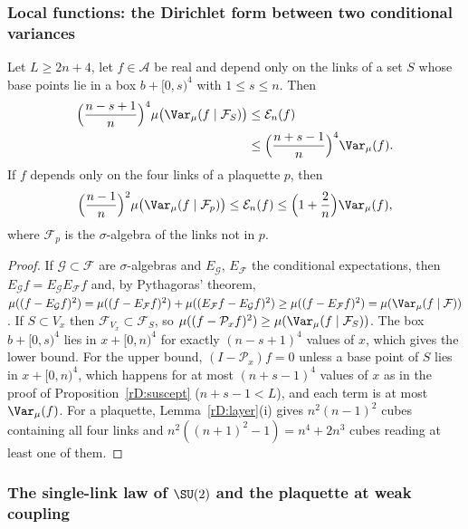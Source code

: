 \subsubsection{Local functions: the Dirichlet form between two conditional
variances}

\begin{proposition}\label{rD:local}
Let $L\ge2n+4$, let $f\in\mathcal A$ be real and depend only on the links
of a set $S$ whose base points lie in a box $b+[0,s)^4$ with $1\le s\le n$.
Then
\[
\begin{split}
\Bigl(\frac{n-s+1}n\Bigr)^4\mu\bigl(\Var_\mu(f\mid\mathcal F_S)\bigr)&\le
\mathcal E_n(f)\\
&\le\Bigl(\frac{n+s-1}n\Bigr)^4\Var_\mu(f).
\end{split}
\]
If $f$ depends only on the four links of a plaquette $p$, then
\[
\Bigl(\frac{n-1}n\Bigr)^2\mu\bigl(\Var_\mu(f\mid\mathcal F_p)\bigr)\le
\mathcal E_n(f)\le\Bigl(1+\frac2n\Bigr)\Var_\mu(f),
\]
where $\mathcal F_p$ is the $\sigma$-algebra of the links not in $p$.
\end{proposition}

\begin{proof}
If $\mathcal G\subset\mathcal F$ are $\sigma$-algebras and $E_{\mathcal G}$,
$E_{\mathcal F}$ the conditional expectations, then $E_{\mathcal G}f=
E_{\mathcal G}E_{\mathcal F}f$ and, by Pythagoras' theorem, $\mu((f-E_{
\mathcal G}f)^2)=\mu((f-E_{\mathcal F}f)^2)+\mu((E_{\mathcal F}f-E_{\mathcal
G}f)^2)\ge\mu((f-E_{\mathcal F}f)^2)=\mu(\Var_\mu(f\mid\mathcal F))$. If
$S\subset V_x$ then $\mathcal F_{V_x}\subset\mathcal F_S$, so $\mu((f-
\mathcal P_xf)^2)\ge\mu(\Var_\mu(f\mid\mathcal F_S))$. The box $b+[0,s)^4$
lies in $x+[0,n)^4$ for exactly $(n-s+1)^4$ values of $x$, which gives the
lower bound. For the upper bound, $(I-\mathcal P_x)f=0$ unless a base point
of $S$ lies in $x+[0,n)^4$, which happens for at most $(n+s-1)^4$ values
of $x$ as in the proof of Proposition~\ref{rD:suscept} ($n+s-1<L$), and
each term is at most $\Var_\mu(f)$. For a plaquette, Lemma~\ref{rD:layer}(i)
gives $n^2(n-1)^2$ cubes containing all four links and $n^2((n+1)^2-1)=
n^4+2n^3$ cubes reading at least one of them.
\end{proof}

\subsubsection{The single-link law of $\SU(2)$ and the plaquette at weak
coupling}

